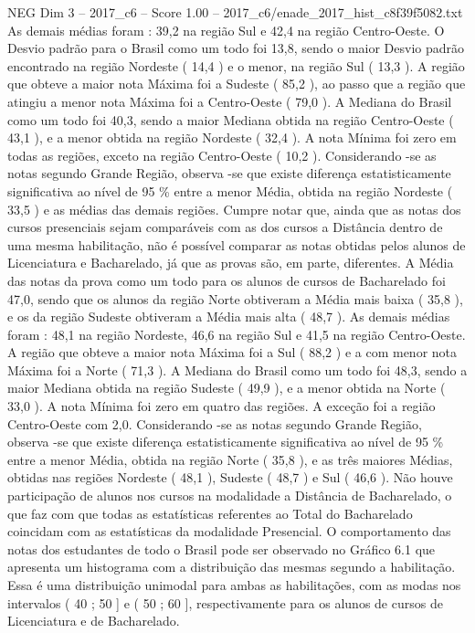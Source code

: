 \begin{textsample}{NEG Dim 3 – 2017\_c6 – Score 1.00 – 2017\_c6/enade\_2017\_hist\_c8f39f5082.txt}
As demais médias foram : 39,2 na região Sul e 42,4 na região Centro-Oeste.
O Desvio padrão para o Brasil como um todo foi 13,8, sendo o maior Desvio padrão encontrado na região Nordeste ( 14,4 ) e o menor, na região Sul ( 13,3 ).
A região que obteve a maior nota Máxima foi a Sudeste ( 85,2 ), ao passo que a região que atingiu a menor nota Máxima foi a Centro-Oeste ( 79,0 ).
A Mediana do Brasil como um todo foi 40,3, sendo a maior Mediana obtida na região Centro-Oeste ( 43,1 ), e a menor obtida na região Nordeste ( 32,4 ).
A nota Mínima foi zero em todas as regiões, exceto na região Centro-Oeste ( 10,2 ).
Considerando -se as notas segundo Grande Região, observa -se que existe diferença estatisticamente significativa ao nível de 95 \% entre a menor Média, obtida na região Nordeste ( 33,5 ) e as médias das demais regiões.
Cumpre notar que, ainda que as notas dos cursos presenciais sejam comparáveis com as dos cursos a Distância dentro de uma mesma habilitação, não é possível comparar as notas obtidas pelos alunos de Licenciatura e Bacharelado, já que as provas são, em parte, diferentes.
A Média das notas da prova como um todo para os alunos de cursos de Bacharelado foi 47,0, sendo que os alunos da região Norte obtiveram a Média mais baixa ( 35,8 ), e os da região Sudeste obtiveram a Média mais alta ( 48,7 ).
As demais médias foram : 48,1 na região Nordeste, 46,6 na região Sul e 41,5 na região Centro-Oeste.
A região que obteve a maior nota Máxima foi a Sul ( 88,2 ) e a com menor nota Máxima foi a Norte ( 71,3 ).
A Mediana do Brasil como um todo foi 48,3, sendo a maior Mediana obtida na região Sudeste ( 49,9 ), e a menor obtida na Norte ( 33,0 ).
A nota Mínima foi zero em quatro das regiões.
A exceção foi a região Centro-Oeste com 2,0.
Considerando -se as notas segundo Grande Região, observa -se que existe diferença estatisticamente significativa ao nível de 95 \% entre a menor Média, obtida na região Norte ( 35,8 ), e as três maiores Médias, obtidas nas regiões Nordeste ( 48,1 ), Sudeste ( 48,7 ) e Sul ( 46,6 ).
Não houve participação de alunos nos cursos na modalidade a Distância de Bacharelado, o que faz com que todas as estatísticas referentes ao Total do Bacharelado coincidam com as estatísticas da modalidade Presencial.
O comportamento das notas dos estudantes de todo o Brasil pode ser observado no Gráfico 6.1 que apresenta um histograma com a distribuição das mesmas segundo a habilitação.
Essa é uma distribuição unimodal para ambas as habilitações, com as modas nos intervalos ( 40 ; 50 ] e ( 50 ; 60 ], respectivamente para os alunos de cursos de Licenciatura e de Bacharelado.

\end{textsample}
